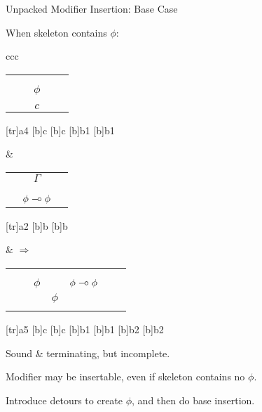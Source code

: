 \begin{hslide}{Unpacked Modifier Insertion: Base Case}


When skeleton contains $\phi$:

\begin{tabular}{ccc}
{\small
\begin{tabular}{ccccc}
\node{a1}{} & \node{a2}{} & &\node{a3}{} &\node{a4}{}\\
  & & \node{b1}{} & & \\
  & & $\phi$ & & \\[2ex]
  & & \node{c}{} & &\\
  & & $c$ & &  
\end{tabular}
[tr]{a4}
[b]{c}
[b]{c}
[b]{b1}
[b]{b1}
}
&
{\small
\begin{tabular}{ccc}
 & $\Gamma$ &\\
\node{a1}{} & &\node{a2}{}\\[2ex]
 & \node{b}{}& \\
 & $\phi\;\mbox{$-\hspace*{-.4ex}\circ$}\;\phi$ &
\end{tabular}
[tr]{a2}
[b]{b}
[b]{b}
}
& 
$\Longrightarrow$
{\small
\begin{tabular}{ccccccc}
\node{a1}{} & \node{a2}{} & &\node{a3}{} & &\node{a4}{} & \node{a5}{}\\
 & & \node{b1}{} & & \node{b2}{} & & \\
 & & $\phi$ & & $\phi\;\mbox{$-\hspace*{-.4ex}\circ$}\;\phi$ & & \\ \cline{3-5}
 & & & $\phi$ & & & \\[5ex]
 & & & \node{c}{} & & &
\end{tabular}
[tr]{a5}
[b]{c}
[b]{c}
[b]{b1}
[b]{b1}
[b]{b2}
[b]{b2}
}
\end{tabular}

Sound \& terminating, but incomplete.

Modifier may be insertable, even if skeleton contains no $\phi$.

Introduce detours to create $\phi$, and then do base insertion.
\end{hslide}

